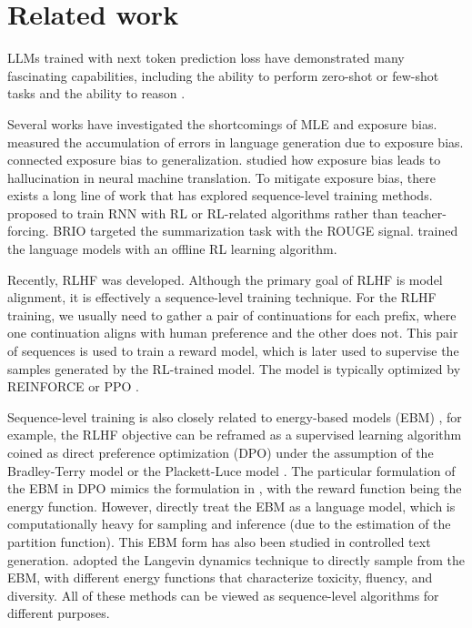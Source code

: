 \section{Related work}

LLMs trained with next token prediction loss \citep{radford2019language,chung2022scaling,sanh2021multitask,zhou2023lima} have demonstrated many fascinating capabilities, including the ability to perform zero-shot or few-shot tasks \citep{radford2019language,brown2020language} and the ability to reason \citep{wei2022chain}. 

Several works have investigated the shortcomings of MLE and exposure bias. \citet{arora2022exposure} measured the accumulation of errors in language generation due to exposure bias. \citet{schmidt2019generalization} connected exposure bias to generalization. \citet{wang2020exposure} studied how exposure bias leads to hallucination in neural machine translation. To mitigate exposure bias, there exists a long line of work that has explored sequence-level training methods. \citet{bengio2015scheduled,ranzato2015sequence} proposed to train RNN with RL or RL-related algorithms rather than teacher-forcing. BRIO \citet{liu2022brio} targeted the summarization task with the ROUGE signal. \citet{pang2020text} trained the language models with an offline RL learning algorithm. 

Recently, RLHF \citep{stiennon2020learning,ouyang2022training} was developed. Although the primary goal of RLHF is model alignment, it is effectively a sequence-level training technique. For the RLHF training, we usually need to gather a pair of continuations for each prefix, where one continuation aligns with human preference and the other does not. This pair of sequences is used to train a reward model, which is later used to supervise the samples generated by the RL-trained model. The model is typically optimized by REINFORCE \citep{williams1992simple} or PPO \citep{schulman2017proximal}. 

Sequence-level training is also closely related to energy-based models (EBM) \citep{korbak2022rl}, for example, the RLHF objective can be reframed as a supervised learning algorithm coined as direct preference optimization (DPO) \citep{rafailov2023direct} under the assumption of the Bradley-Terry model \citep{bradley1952rank} or the Plackett-Luce model \citep{plackett1975analysis,luce2012individual}. The particular formulation of the EBM in DPO mimics the formulation in \citet{deng2020residual}, with the reward function being the energy function. However, \citet{deng2020residual} directly treat the EBM as a language model, which is computationally heavy for sampling and inference (due to the estimation of the partition function). This EBM form has also been studied in controlled text generation. \citet{kumar2022gradient} adopted the Langevin dynamics technique to directly sample from the EBM, with different energy functions that characterize toxicity, fluency, and diversity. All of these methods can be viewed as sequence-level algorithms for different purposes. 